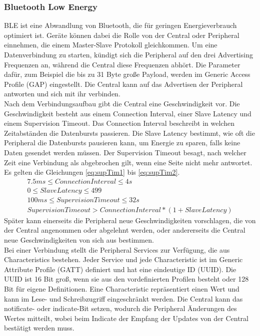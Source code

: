 \subsubsection{Bluetooth Low Energy}
BLE ist eine Abwandlung von Bluetooth, die für geringen Energieverbrauch optimiert ist.
Geräte können dabei die Rolle von der Central oder Peripheral einnehmen, die einem Master-Slave Protokoll gleichkommen.
Um eine Datenverbindung zu starten, kündigt sich die Peripheral auf den drei Advertising Frequenzen an, während die Central diese Frequenzen abhört.
Die Parameter dafür, zum Beispiel die bis zu 31 Byte große Payload, werden im Generic Access Profile (GAP) eingestellt.
Die Central kann auf das Advertisen der Peripheral antworten und sich mit ihr verbinden. \cite{site_adabt}\\
Nach dem Verbindungsaufbau gibt die Central eine Geschwindigkeit vor.
Die Geschwindigkeit besteht aus einem Connection Interval, einer Slave Latency und einem Supervision Timeout.
Das Connection Interval beschreibt in welchen Zeitabständen die Datenbursts passieren.
Die Slave Latency bestimmt, wie oft die Peripheral die Datenbursts pausieren kann, um Energie zu sparen, falls keine Daten gesendet werden müssen.
Der Supervision Timeout besagt, nach welcher Zeit eine Verbindung als abgebrochen gilt, wenn eine Seite nicht mehr antwortet.
Es gelten die Gleichungen \ref{eq:supTim1} bis \ref{eq:supTim2}.
\begin{gather}
  \label{eq:supTim1}
	7.5 ms \leq Connection Interval \leq 4 s\\
	0 \leq Slave Latency \leq 499\\
	100 ms \leq Supervision Timeout \leq 32 s\\
  \label{eq:supTim2}
	Supervision Timeout > Connection Interval * (1 + Slave Latency)
\end{gather}
Später kann einerseits die Peripheral neue Geschwindigkeiten vorschlagen, die von der Central angenommen oder abgelehnt werden, oder andererseits die Central neue Geschwindigkeiten von sich aus bestimmen. \cite{site_tigap}\\
Bei einer Verbindung stellt die Peripheral Services zur Verfügung, die aus Characteristics bestehen.
Jeder Service und jede Characteristic ist im Generic Attribute Profile (GATT) definiert und hat eine eindeutige ID (UUID).
Die UUID ist 16 Bit groß, wenn sie aus den vordefinierten Profilen besteht oder 128 Bit für eigene Definitionen.
Eine Characteristic repräsentiert einen Wert und kann im Lese- und Schreibzugriff eingeschränkt werden.
Die Central kann das notificate- oder indicate-Bit setzen, wodurch die Peripheral Änderungen des Wertes mitteilt, wobei beim Indicate der Empfang der Updates von der Central bestätigt werden muss. \cite{site_norChara}\\
